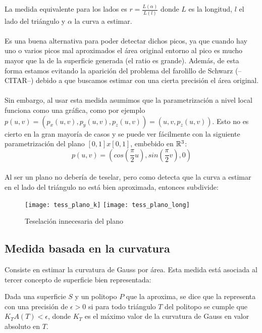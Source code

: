 	La medida equivalente para los lados es $r=\frac{L(\alpha)} {L(l)}$ donde $L$ es la longitud, $l$ el lado del triángulo y $\alpha$ la curva a estimar.\\
	\\Es una buena alternativa para poder detectar dichos picos, ya que cuando hay uno o varios picos mal aproximados el área original entorno al pico es mucho mayor que la de la superficie generada (el ratio es grande). Además, de esta forma estamos evitando la aparición del problema del farolillo de Schwarz (--CITAR--) debido a que buscamos estimar con una cierta precisión el área original.\\
	\\Sin embargo, al usar esta medida asumimos que la parametrización a nivel local funciona como una gráfica, como por ejemplo $p(u,v)=(p_x(u,v),p_y(u,v),p_z(u,v)) = (u,v,p_z(u,v))$. Esto no es cierto en la gran mayoría de casos y se puede ver fácilmente con la siguiente parametrización del plano $[0,1]x[0,1]$, embebido en $\mathbb{R}^3$:
	$$p(u,v)=(cos(\frac{\pi}{2} u), sin(\frac{\pi}{2} v), 0 )$$
	\\Al ser un plano no debería de teselar, pero como detecta que la curva a estimar en el lado del triángulo no está bien aproximada, entonces subdivide:
	\begin{figure}[h]
  		\centering
  		\texttt{[image: tess\_plano\_k]}
  		\texttt{[image: tess\_plano\_long]}
  		\caption{Teselación innecesaria del plano}
  		\label{fig:plano_tess}
	\end{figure}
	
	\subsection{Medida basada en la curvatura}
	Consiste en estimar la curvatura de Gauss por área. Esta medida está asociada al tercer concepto de superficie bien representada:
	\begin{definicion}
		Dada una superficie $S$ y un politopo $P$ que la aproxima, se dice que la representa con una precisión de $\epsilon > 0$ si para todo triángulo $T$ del politopo se cumple que $K_T A(T) < \epsilon$, donde $K_T$ es el máximo valor de la curvatura de Gauss en valor absoluto en $T$.
	\end{definicion}
	
